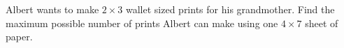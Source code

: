 Albert wants to make $2\times 3$ wallet sized prints for his grandmother. Find the maximum possible number of prints Albert can make using one $4 \times 7$ sheet of paper.
